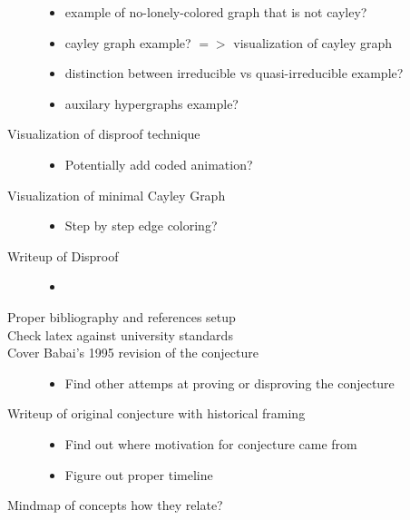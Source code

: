 \documentclass[a4paper,10pt]{article}
\begin{document}
\begin{description}
\begin{itemize}
        \item example of no-lonely-colored graph that is not cayley?
        \item cayley graph example? \(=>\) visualization of cayley graph
        \item distinction between irreducible vs quasi-irreducible example?
        \item auxilary hypergraphs example?
    \end{itemize}
    \item[Visualization of disproof technique] 
    \begin{itemize}
        \item Potentially add coded animation?
    \end{itemize}
    \item[Visualization of minimal Cayley Graph] 
    \begin{itemize}
        \item Step by step edge coloring?
    \end{itemize}
    \item[Writeup of Disproof] 
    \begin{itemize}
        \item
    \end{itemize}
    \item[Proper bibliography and references setup]
    \item[Check latex against university standards]  
    \item[Cover Babai's 1995 revision of the conjecture]
    \begin{itemize}
        \item Find other attemps at proving or disproving the conjecture
    \end{itemize}
    \item[Writeup of original conjecture with historical framing]  
    \begin{itemize}
        \item Find out where motivation for conjecture came from
        \item Figure out proper timeline
    \end{itemize}
     \item[Mindmap of concepts how they relate?]  
\end{description}
\end{document}
